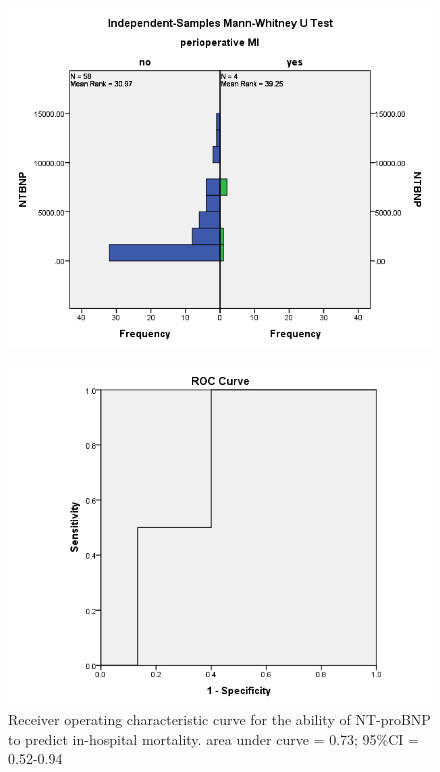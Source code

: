 \documentclass[14pt,a4paper,onecolumn]{extarticle}
\begin{document}
\clearpage
\begin{figure}
    \centering
    \includegraphics[scale=0.7]{./images/manwhit_mi.png}
    \caption{}
    \label{}
\end{figure}

\clearpage
\begin{figure}
    \centering
    \includegraphics[scale=0.7]{./images/roc_mort.png}
    \caption{Receiver operating characteristic curve for the ability of NT-proBNP to predict in-hospital mortality.  area under curve = 0.73; 95\%CI = 0.52-0.94}
    \label{}
\end{figure}
\end{document}

